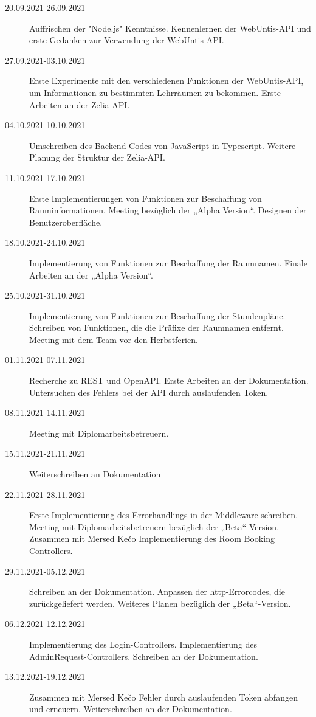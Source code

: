 
\begin{description}
    \item[20.09.2021-26.09.2021] Auffrischen der "Node.js" Kenntnisse. Kennenlernen der WebUntis-API und erste Gedanken zur Verwendung der WebUntis-API.
    \item[27.09.2021-03.10.2021] Erste Experimente mit den verschiedenen Funktionen der WebUntis-API, um Informationen zu bestimmten Lehrräumen zu bekommen. Erste Arbeiten an der Zelia-API. 
    \item[04.10.2021-10.10.2021] Umschreiben des Backend-Codes von JavaScript in Typescript. Weitere Planung der Struktur der Zelia-API.
    \item[11.10.2021-17.10.2021] Erste Implementierungen von Funktionen zur Beschaffung von Rauminformationen. Meeting bezüglich der „Alpha Version“. Designen der Benutzeroberfläche. 
    \item[18.10.2021-24.10.2021] Implementierung von Funktionen zur Beschaffung der Raumnamen. Finale Arbeiten an der „Alpha Version“.
    \item[25.10.2021-31.10.2021] Implementierung von Funktionen zur Beschaffung der Stundenpläne. Schreiben von Funktionen, die die Präfixe der Raumnamen entfernt. Meeting mit dem Team vor den Herbstferien. 
    \item[01.11.2021-07.11.2021] Recherche zu REST und OpenAPI. Erste Arbeiten an der Dokumentation. Untersuchen des Fehlers bei der API durch auslaufenden Token. 
    \item[08.11.2021-14.11.2021] Meeting mit Diplomarbeitsbetreuern.
    \item[15.11.2021-21.11.2021] Weiterschreiben an Dokumentation
    \item[22.11.2021-28.11.2021] Erste Implementierung des Errorhandlings in der Middleware schreiben. Meeting mit Diplomarbeitsbetreuern bezüglich der „Beta“-Version. Zusammen mit Mersed Kečo Implementierung des Room Booking Controllers.
    \item[29.11.2021-05.12.2021] Schreiben an der Dokumentation. Anpassen der http-Errorcodes, die zurückgeliefert werden. Weiteres Planen bezüglich der „Beta“-Version.
    \item[06.12.2021-12.12.2021] Implementierung des Login-Controllers. Implementierung des AdminRequest-Controllers. Schreiben an der Dokumentation. 
    \item[13.12.2021-19.12.2021] Zusammen mit Mersed Kečo Fehler durch auslaufenden Token abfangen und erneuern. Weiterschreiben an der Dokumentation. 

\end{description}
